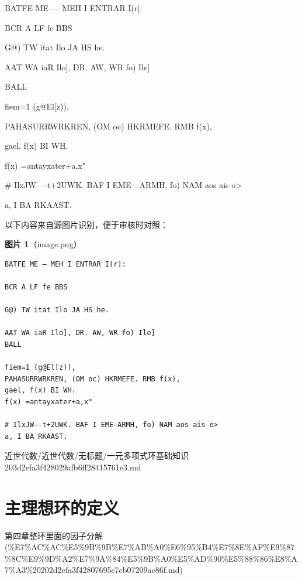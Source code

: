 \begin{note}[一元多项式环基础知识]

BATFE ME — MEH I ENTRAR I(r]:

BCR A LF fe BBS

G@) TW itat Ilo JA HS he.

AAT WA iaR Ilo], DR. AW, WR fo) Ile]

BALL

fiem=1 (g@El[z)),

PAHASURRWRKREN, (OM oc) HKRMEFE. RMB f(x),

gael, f(x) BI WH.

f(x) =antayxater+a,x"

\# IlxJW—-t+2UWK. BAF I EME—ARMH, fo) NAM aos ais o>

a, I BA RKAAST.

\end{note}

\begin{note}
以下内容来自源图片识别，便于审核时对照：

\textbf{图片 1}（image.png）
\begin{Verbatim}[fontsize=\small]
BATFE ME — MEH I ENTRAR I(r]:

BCR A LF fe BBS

G@) TW itat Ilo JA HS he.

AAT WA iaR Ilo], DR. AW, WR fo) Ile]
BALL

fiem=1 (g@El[z)),
PAHASURRWRKREN, (OM oc) HKRMEFE. RMB f(x),
gael, f(x) BI WH.
f(x) =antayxater+a,x"

# IlxJW—-t+2UWK. BAF I EME—ARMH, fo) NAM aos ais o>
a, I BA RKAAST.
\end{Verbatim}

\end{note}

\begin{note}[来源路径]

近世代数/近世代数/无标题/一元多项式环基础知识 203d2efa3f428029afb6ff28415761e3.md

\end{note}

\section*{主理想环的定义}

\begin{note}[来源上级主题]

第四章整环里面的因子分解 (\%E7\%AC\%AC\%E5\%9B\%9B\%E7\%AB\%A0\%E6\%95\%B4\%E7\%8E\%AF\%E9\%87\%8C\%E9\%9D\%A2\%E7\%9A\%84\%E5\%9B\%A0\%E5\%AD\%90\%E5\%88\%86\%E8\%A7\%A3\%20202d2efa3f42807695c7cb07209ac86f.md)

\end{note}

